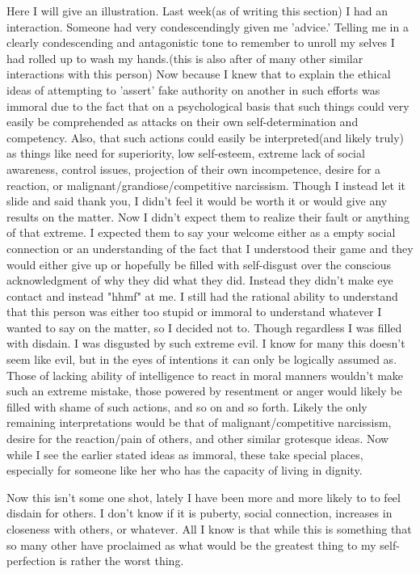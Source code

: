 \par Here I will give an illustration. Last week(as of writing this section) I had an interaction. Someone had very condescendingly given me 'advice.' Telling me in a clearly condescending and antagonistic tone to remember to unroll my selves I had rolled up to wash my hands.(this is also after of many other similar interactions with this person) Now because I knew that to explain the ethical ideas of attempting to 'assert' fake authority on another in such efforts was immoral due to the fact that on a psychological basis that such things could very easily be comprehended as attacks on their own self-determination and competency. Also, that such actions could easily be interpreted(and likely truly) as things like need for superiority, low self-esteem, extreme lack of social awareness, control issues, projection of their own incompetence, desire for a reaction, or malignant/grandiose/competitive narcissism. Though I instead let it slide and said thank you, I didn't feel it would be worth it or would give any results on the matter. Now I didn't expect them to realize their fault or anything of that extreme. I expected them to say your welcome either as a empty social connection or an understanding of the fact that I understood their game and they would either give up or hopefully be filled with self-disgust over the conscious acknowledgment of why they did what they did. Instead they didn't make eye contact and instead "hhmf" at me. I still had the rational ability to understand that this person was either too stupid or immoral to understand whatever I wanted to say on the matter, so I decided not to. Though regardless I was filled with disdain. I was disgusted by such extreme evil. I know for many this doesn't seem like evil, but in the eyes of intentions it can only be logically assumed as. Those of lacking ability of intelligence to react in moral manners wouldn't make such an extreme mistake, those powered by resentment or anger would likely be filled with shame of such actions, and so on and so forth. Likely the only remaining interpretations would be that of malignant/competitive narcissism, desire for the reaction/pain of others, and other similar grotesque ideas. Now while I see the earlier stated ideas as immoral, these take special places, especially for someone like her who has the capacity of living in dignity. 
\par Now this isn't some one shot, lately I have been more and more likely to to feel disdain for others. I don't know if it is puberty, social connection, increases in closeness with others, or whatever. All I know is that while this is something that so many other have proclaimed as what would be the greatest thing to my self-perfection is rather the worst thing.
